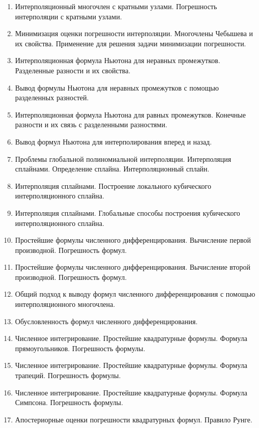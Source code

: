 \documentclass[14pt]{extarticle}
\begin{document}
\begin{enumerate}
    \item Интерполяционный многочлен с кратными узлами. Погрешность интерполяции с кратными узлами. 
    \item Минимизация оценки погрешности интерполяции. Многочлены Чебышева и их свойства. Применение для решения задачи минимизации погрешности. 
    \item Интерполяционная формула Ньютона для неравных промежутков. Разделенные разности и их свойства. 
    \item Вывод формулы Ньютона для неравных промежутков с помощью разделенных разностей.  
    \item Интерполяционная формула Ньютона для равных промежутков. Конечные разности и их связь с разделенными разностями. 
    \item Вывод формул Ньютона для интерполирования вперед и назад. 
    \item Проблемы глобальной полиномиальной интерполяции. Интерполяция сплайнами. Определение сплайна. Интерполяционный сплайн. 
    \item Интерполяция сплайнами. Построение локального кубического интерполяционного сплайна. 
    \item Интерполяция сплайнами. Глобальные способы построения кубического интерполяционного сплайна. 
    \item Простейшие формулы численного дифференцирования. Вычисление первой производной. Погрешность формул. 
    \item Простейшие формулы численного дифференцирования. Вычисление второй производной. Погрешность формул. 
    \item Общий подход к выводу формул численного дифференцирования с помощью интерполяционного многочлена. 
    \item Обусловленность формул численного дифференцирования. 
    \item Численное интегрирование. Простейшие квадратурные формулы. Формула прямоугольников. Погрешность формулы. 
    \item Численное интегрирование. Простейшие квадратурные формулы. Формула трапеций. Погрешность формулы. 
    \item Численное интегрирование. Простейшие квадратурные формулы. Формула Симпсона. Погрешность формулы. 
    \item Апостериорные оценки погрешности квадратурных формул. Правило Рунге.
\end{enumerate}
\end{document}
